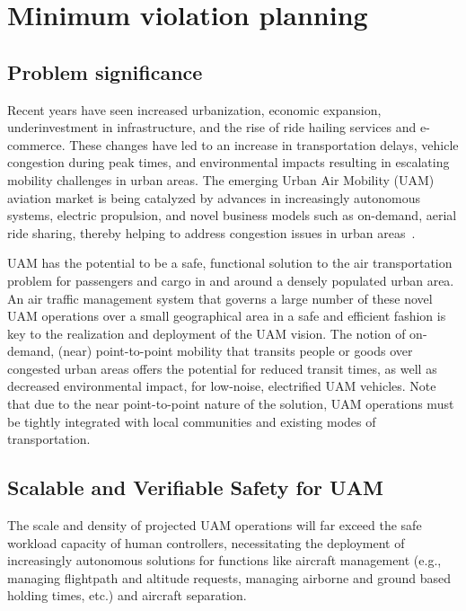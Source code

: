 \section{Minimum violation planning}

\subsection{Problem significance}
Recent years have seen increased urbanization, economic expansion, underinvestment in infrastructure, and the rise of ride hailing services and e-commerce.  These changes have led to an increase in transportation delays, vehicle congestion during peak times, and environmental impacts resulting in escalating mobility challenges in urban areas. The emerging Urban Air Mobility (UAM) aviation market is being catalyzed by advances in increasingly autonomous systems, electric propulsion, and novel business models such as on-demand, aerial ride sharing, thereby helping to address congestion issues in urban areas~\cite{flightplan2030}.  

UAM has the potential to be a safe, functional solution to the air transportation problem for passengers and cargo in and around a densely populated urban area.  An air traffic management system that governs a large number of these novel UAM operations over a small geographical area in a safe and efficient fashion is key to the realization and deployment of the UAM vision.  The notion of on-demand, (near) point-to-point mobility that transits people or goods over congested urban areas offers the potential for reduced transit times, as well as decreased environmental impact, for low-noise, electrified UAM vehicles.  Note that due to the near point-to-point nature of the solution, UAM operations must be tightly integrated with local communities and existing modes of transportation. 


\subsection{Scalable and Verifiable Safety for UAM}
The scale and density of projected UAM operations will far exceed the safe workload capacity of human controllers, necessitating the deployment of increasingly autonomous solutions for functions like aircraft management (e.g., managing flightpath and altitude requests, managing airborne and ground based holding times, etc.) and aircraft separation.

